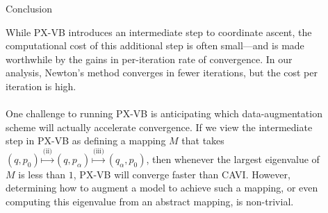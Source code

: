 \documentclass[final]{beamer}
\newlength{\sepwid}
\newlength{\onecolwid}
\newlength{\twocolwid}
\begin{document}
\begin{frame}[t]
\begin{columns}[t]
\begin{column}{\twocolwid}
%
%
%
%
%

\end{column} %

\begin{column}{\sepwid}\end{column} %

\begin{column}{\onecolwid} %


\begin{block}{Conclusion}

While PX-VB introduces an intermediate step to coordinate ascent, the computational cost of this additional step is often small---and is made worthwhile by the gains in per-iteration rate of convergence. In our analysis, Newton's method converges in fewer iterations, but the cost per iteration is high. \\~\\

One challenge to running PX-VB is anticipating which data-augmentation scheme will actually accelerate convergence. If we view the intermediate step in PX-VB as defining a mapping $M$ that takes $(q, p_0) \stackrel{\text{(ii)}}{\mapsto} (q, p_\alpha) \stackrel{\text{(iii)}}{\mapsto} (q_\alpha, p_0)$, then whenever the largest eigenvalue of $M$ is less than $1$, PX-VB will converge faster than CAVI. However, determining how to augment a model to achieve such a mapping, or even computing this eigenvalue from an abstract mapping, is non-trivial.


\end{block}
\end{column}
\end{columns}
\end{frame}
\end{document}
